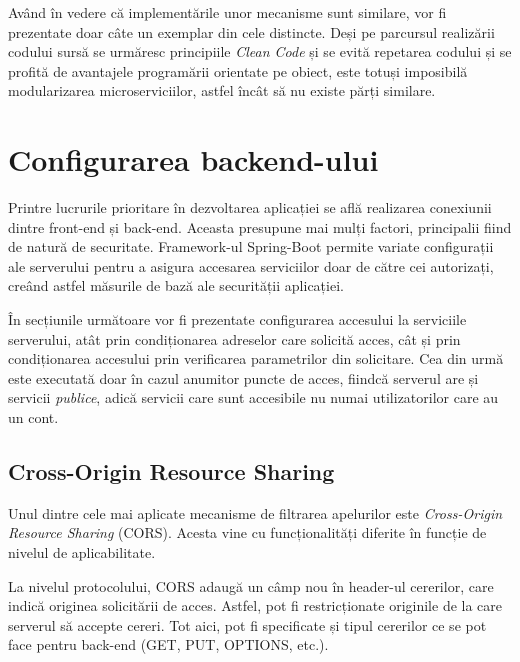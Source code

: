 \documentclass[12pt,a4paper]{report}
\theoremstyle{definition}
\theoremstyle{remark}
\begin{document}
\par Având în vedere că implementările unor mecanisme sunt similare, vor fi prezentate doar câte un exemplar din cele distincte. Deși pe parcursul realizării codului sursă se urmăresc principiile \textit{Clean Code}\cite{martin2009clean} și se evită repetarea codului și se profită de avantajele programării orientate pe obiect, este totuși imposibilă modularizarea microserviciilor, astfel încât să nu existe părți similare.

\section{Configurarea backend-ului}
\par Printre lucrurile prioritare în dezvoltarea aplicației se află realizarea conexiunii dintre front-end și back-end. Aceasta presupune mai mulți factori, principalii fiind de natură de securitate. Framework-ul Spring-Boot permite variate configurații ale serverului pentru a asigura accesarea serviciilor doar de către cei autorizați, creând astfel măsurile de bază ale securității aplicației\cite{scarioni2019pro}.

\par În secțiunile următoare vor fi prezentate configurarea accesului la serviciile serverului, atât prin condiționarea adreselor care solicită acces, cât și prin condiționarea accesului prin verificarea parametrilor din solicitare. Cea din urmă este executată doar în cazul anumitor puncte de acces, fiindcă serverul are și servicii \textit{publice}, adică servicii care sunt accesibile nu numai utilizatorilor care au un cont.

\subsection{Cross-Origin Resource Sharing}
\par Unul dintre cele mai aplicate mecanisme de filtrarea apelurilor este \textit{Cross-Origin Resource Sharing}\cite{gibbinscross} (CORS). Acesta vine cu funcționalități diferite în funcție de nivelul de aplicabilitate.

\par La nivelul protocolului, CORS adaugă un câmp nou în header-ul cererilor, care indică originea solicitării de acces. Astfel, pot fi restricționate originile de la care serverul să accepte cereri. Tot aici, pot fi specificate și tipul cererilor ce se pot face pentru back-end (GET, PUT, OPTIONS, etc.).
\end{document}

